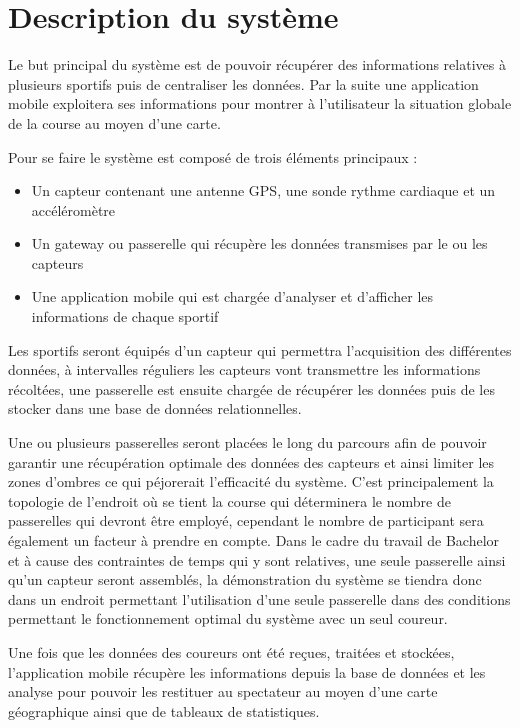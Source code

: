 \chapter{Description du système}

Le but principal du système est de pouvoir récupérer des informations relatives à plusieurs sportifs puis de centraliser les données. Par la suite une application mobile exploitera ses informations pour montrer à l’utilisateur la situation globale de la course au moyen d’une carte.

Pour se faire le système est composé de trois éléments principaux :
\begin{itemize}
\item Un capteur contenant une antenne GPS, une sonde rythme cardiaque et un accéléromètre
\item Un gateway ou passerelle qui récupère les données transmises par le ou les capteurs
\item Une application mobile qui est chargée d’analyser et d’afficher les informations de chaque sportif
\end{itemize}

Les sportifs seront équipés d’un capteur qui permettra l’acquisition des différentes données, à intervalles réguliers les capteurs vont transmettre les informations récoltées, une passerelle est ensuite chargée de récupérer les données puis de les stocker dans une base de données relationnelles.

Une ou plusieurs passerelles seront placées le long du parcours afin de pouvoir garantir une récupération optimale des données des capteurs et ainsi limiter les zones d’ombres ce qui péjorerait l’efficacité du système. C’est principalement la topologie de l’endroit où se tient la course qui déterminera le nombre de passerelles qui devront être employé, cependant le nombre de participant sera également un facteur à prendre en compte. Dans le cadre du travail de Bachelor et à cause des contraintes de temps qui y sont relatives, une seule passerelle ainsi qu’un capteur seront assemblés, la démonstration du système se tiendra donc dans un endroit permettant l’utilisation d’une seule passerelle dans des conditions permettant le fonctionnement optimal du système avec un seul coureur.

Une fois que les données des coureurs ont été reçues, traitées et stockées, l’application mobile récupère les informations depuis la base de données et les analyse pour pouvoir les restituer au spectateur au moyen d’une carte géographique ainsi que de tableaux de statistiques.

